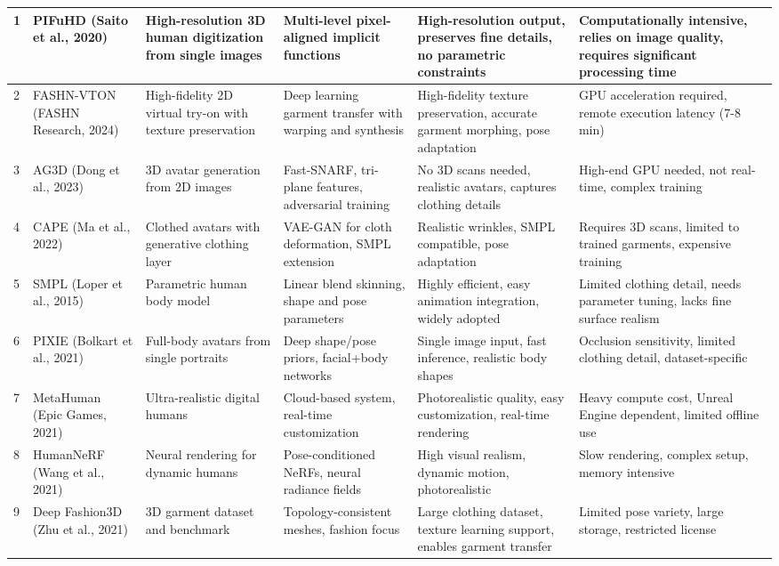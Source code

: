 \documentclass[12pt,a4paper,oneside]{report}
\begin{document}
\begin{center}
\begin{longtable}{|p{0.1cm}|p{1.9cm}|p{2.0cm}|p{2.0cm}|p{2.0cm}|p{2.0cm}|}
1 & PIFuHD (Saito et al., 2020) & High-resolution 3D human digitization from single images & Multi-level pixel-aligned implicit functions & High-resolution output, preserves fine details, no parametric constraints & Computationally intensive, relies on image quality, requires significant processing time \\
\hline
2 & FASHN-VTON (FASHN Research, 2024) & High-fidelity 2D virtual try-on with texture preservation & Deep learning garment transfer with warping and synthesis & High-fidelity texture preservation, accurate garment morphing, pose adaptation & GPU acceleration required, remote execution latency (7-8 min) \\
\hline
3 & AG3D (Dong et al., 2023) & 3D avatar generation from 2D images & Fast-SNARF, tri-plane features, adversarial training & No 3D scans needed, realistic avatars, captures clothing details & High-end GPU needed, not real-time, complex training \\
\hline
4 & CAPE (Ma et al., 2022) & Clothed avatars with generative clothing layer & VAE-GAN for cloth deformation, SMPL extension & Realistic wrinkles, SMPL compatible, pose adaptation & Requires 3D scans, limited to trained garments, expensive training \\
\hline
5 & SMPL (Loper et al., 2015) & Parametric human body model & Linear blend skinning, shape and pose parameters & Highly efficient, easy animation integration, widely adopted & Limited clothing detail, needs parameter tuning, lacks fine surface realism \\
\hline
6 & PIXIE (Bolkart et al., 2021) & Full-body avatars from single portraits & Deep shape/pose priors, facial+body networks & Single image input, fast inference, realistic body shapes & Occlusion sensitivity, limited clothing detail, dataset-specific \\
\hline
7 & MetaHuman (Epic Games, 2021) & Ultra-realistic digital humans & Cloud-based system, real-time customization & Photorealistic quality, easy customization, real-time rendering & Heavy compute cost, Unreal Engine dependent, limited offline use \\
\hline
8 & HumanNeRF (Wang et al., 2021) & Neural rendering for dynamic humans & Pose-conditioned NeRFs, neural radiance fields & High visual realism, dynamic motion, photorealistic & Slow rendering, complex setup, memory intensive \\
\hline
9 & Deep Fashion3D (Zhu et al., 2021) & 3D garment dataset and benchmark & Topology-consistent meshes, fashion focus & Large clothing dataset, texture learning support, enables garment transfer & Limited pose variety, large storage, restricted license \\

\end{longtable}
\end{center}
\end{document}
